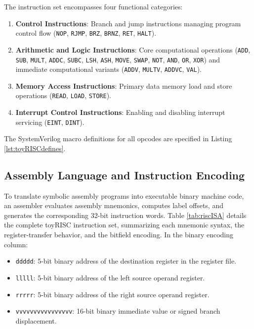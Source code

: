 The instruction set encompasses four functional categories:
\begin{enumerate}
    \item \textbf{Control Instructions}: Branch and jump instructions managing program control flow (\texttt{NOP}, \texttt{RJMP}, \texttt{BRZ}, \texttt{BRNZ}, \texttt{RET}, \texttt{HALT}).
    \item \textbf{Arithmetic and Logic Instructions}: Core computational operations (\texttt{ADD}, \texttt{SUB}, \texttt{MULT}, \texttt{ADDC}, \texttt{SUBC}, \texttt{LSH}, \texttt{ASH}, \texttt{MOVE}, \texttt{SWAP}, \texttt{NOT}, \texttt{AND}, \texttt{OR}, \texttt{XOR}) and immediate computational variants (\texttt{ADDV}, \texttt{MULTV}, \texttt{ADDVC}, \texttt{VAL}).
    \item \textbf{Memory Access Instructions}: Primary data memory load and store operations (\texttt{READ}, \texttt{LOAD}, \texttt{STORE}).
    \item \textbf{Interrupt Control Instructions}: Enabling and disabling interrupt servicing (\texttt{EINT}, \texttt{DINT}).
\end{enumerate}

The SystemVerilog macro definitions for all opcodes are specified in Listing \ref{lst:toyRISCdefines}.


\subsection{Assembly Language and Instruction Encoding}\label{sec:toyrisc_asm}

To translate symbolic assembly programs into executable binary machine code, an assembler evaluates assembly mnemonics, computes label offsets, and generates the corresponding 32-bit instruction words. Table \ref{tab:riscISA} details the complete toyRISC instruction set, summarizing each mnemonic syntax, the register-transfer behavior, and the bitfield encoding. In the binary encoding column:
\begin{itemize}
    \item \texttt{ddddd}: 5-bit binary address of the destination register in the register file.
    \item \texttt{lllll}: 5-bit binary address of the left source operand register.
    \item \texttt{rrrrr}: 5-bit binary address of the right source operand register.
    \item \texttt{vvvvvvvvvvvvvvvv}: 16-bit binary immediate value or signed branch displacement.
\end{itemize}

